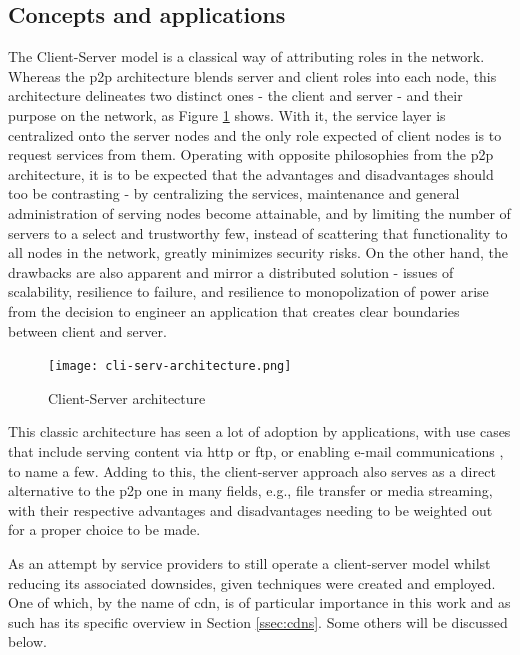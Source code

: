\label{sec:state-client-server}

\subsection{Concepts and applications}

    The Client-Server model is a classical way of attributing roles in the network.
    Whereas the \gls{p2p} architecture blends server and client roles into each node, this architecture delineates two distinct ones - the client and server - and their purpose on the network, as Figure \ref{fig:cli-serv-architecture} shows.
    With it, the service layer is centralized onto the server nodes and the only role expected of client nodes is to request services from them.
    Operating with opposite philosophies from the \gls{p2p} architecture, it is to be expected that the advantages and disadvantages should too be contrasting - by centralizing the services, maintenance and general administration of serving nodes become attainable, and by limiting the number of servers to a select and trustworthy few, instead of scattering that functionality to all nodes in the network, greatly minimizes security risks.
    On the other hand, the drawbacks are also apparent and mirror a distributed solution - issues of scalability, resilience to failure, and resilience to monopolization of power arise from the decision to engineer an application that creates clear boundaries between client and server.

    \begin{figure}[!h]
    \centering
    \texttt{[image: cli-serv-architecture.png]}
    \caption{Client-Server architecture \cite{cliserv-p2p}}
    \label{fig:cli-serv-architecture}
    \end{figure}

    This classic architecture has seen a lot of adoption by applications, with use cases that include serving content via \gls{http} or \gls{ftp}, or enabling e-mail communications \cite{cliserv-p2p}, to name a few.
    Adding to this, the client-server approach also serves as a direct alternative to the \gls{p2p} one in many fields, e.g., file transfer or media streaming, with their respective advantages and disadvantages needing to be weighted out for a proper choice to be made.

    As an attempt by service providers to still operate a client-server model whilst reducing its associated downsides, given techniques were created and employed.
    One of which, by the name of \gls{cdn}, is of particular importance in this work and as such has its specific overview in Section \ref{ssec:cdns}.
    Some others will be discussed below.

